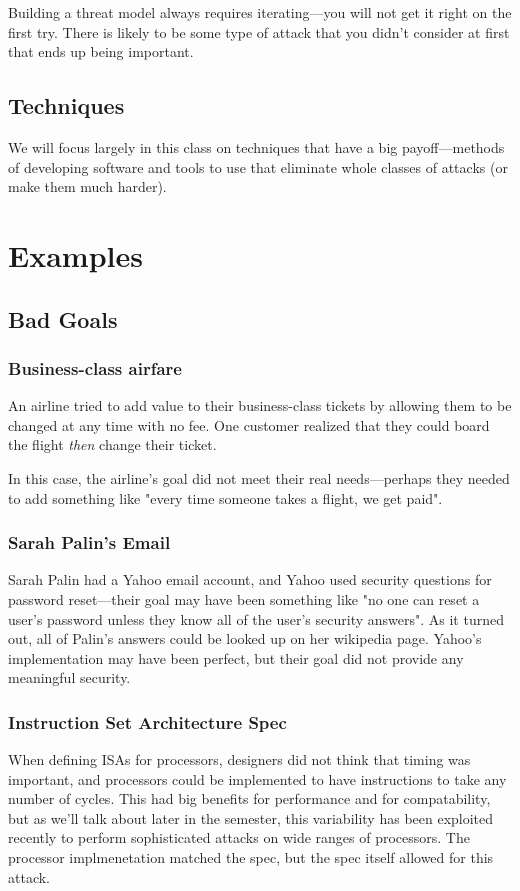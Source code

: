 Building a threat model always requires iterating---you will not get it right on the first try. There is likely to be some type of attack that you didn't consider at first that ends up being important.

\subsection{Techniques}
We will focus largely in this class on techniques that have a big payoff---methods of developing software and tools to use that eliminate whole classes of attacks (or make them much harder). 

\section{Examples}
\subsection{Bad Goals}
\subsubsection{Business-class airfare}
An airline tried to add value to their business-class tickets by allowing them to be changed at any time with no fee. One customer realized that they could board the flight \textit{then} change their ticket.

In this case, the airline's goal did not meet their real needs---perhaps they needed to add something like "every time someone takes a flight, we get paid".

\subsubsection{Sarah Palin's Email}
Sarah Palin had a Yahoo email account, and Yahoo used security questions for password reset---their goal may have been something like "no one can reset a user's password unless they know all of the user's security answers". As it turned out, all of Palin's answers could be looked up on her wikipedia page. Yahoo's implementation may have been perfect, but their goal did not provide any meaningful security.

\subsubsection{Instruction Set Architecture Spec}
When defining ISAs for processors, designers did not think that timing was important, and processors could be implemented to have instructions to take any number of cycles. This had big benefits for performance and for compatability, but as we'll talk about later in the semester, this variability has been exploited recently to perform sophisticated attacks on wide ranges of processors. The processor implmenetation matched the spec, but the spec itself allowed for this attack.

